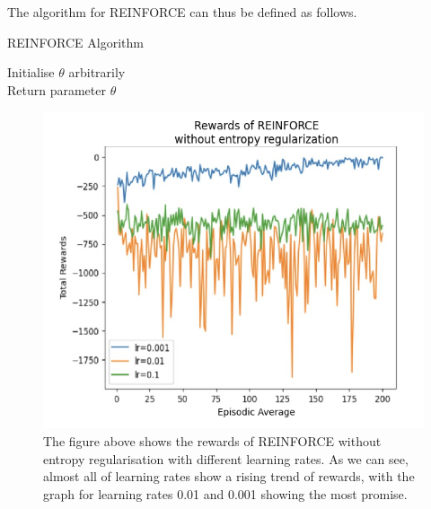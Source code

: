 \documentclass{article}
\begin{document}
The algorithm for REINFORCE can thus be defined as follows. 
\begin{algorithm}[h!]
\caption{REINFORCE Algorithm}
\SetAlgoLined
\DontPrintSemicolon
\small %
Initialise $\theta$ arbitrarily\;\\
Return parameter $\theta$\;
\end{algorithm}

\begin{figure}[h!]
\centering
\includegraphics[width=0.85\linewidth]{Report/images/02.Rewards_of_REINFORCE_without_ER.png}
\caption{\label{fig:Reinforce Rewards}The figure above shows the rewards of REINFORCE without entropy regularisation with different learning rates. As we can see, almost all of learning rates show a rising trend of rewards, with the graph for learning rates 0.01 and 0.001 showing the most promise. }
\end{figure}
\end{document}
